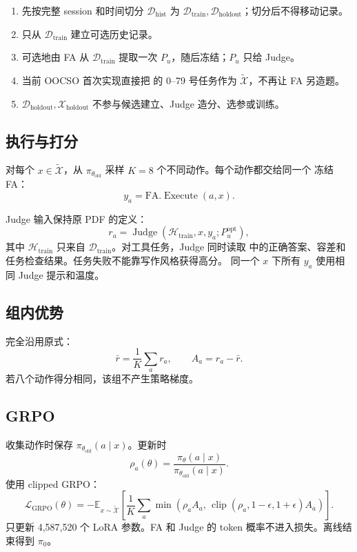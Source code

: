 \documentclass[11pt,UTF8,fontset=none]{ctexart}
\newcommand{\Dhist}{\mathcal D_{\mathrm{hist}}}
\newcommand{\Dtrain}{\mathcal D_{\mathrm{train}}}
\newcommand{\Dholdout}{\mathcal D_{\mathrm{holdout}}}
\newcommand{\Xholdout}{\mathcal X_{\mathrm{holdout}}}
\newcommand{\Xsim}{\widetilde{\mathcal X}}
\newcommand{\policy}{\pi_{\theta}}
\newcommand{\oldpolicy}{\pi_{\theta_{\mathrm{old}}}}
\newcommand{\FA}{\mathrm{FA}}
\newcommand{\Judge}{\operatorname{Judge}}
\newcommand{\clip}{\operatorname{clip}}
\begin{document}
\begin{enumerate}
  \item 先按完整 session 和时间切分 \(\Dhist\) 为
    \(\Dtrain,\Dholdout\)；切分后不得移动记录。
  \item 只从 \(\Dtrain\) 建立可选历史记录。
  \item 可选地由 FA 从 \(\Dtrain\) 提取一次 \(P_u\)，随后冻结；\(P_u\) 只给 Judge。
  \item 当前 OOCSO 首次实现直接把
     的 0--79 号任务作为 \(\Xsim\)，不再让 FA 另造题。
  \item \(\Dholdout,\Xholdout\) 不参与候选建立、Judge 造分、选参或训练。
\end{enumerate}

\subsection{执行与打分}

对每个 \(x\in\Xsim\)，从 \(\oldpolicy\) 采样 \(K=8\) 个不同动作。每个动作都交给同一个
冻结 FA：
\begin{equation}
  y_a=\FA.\operatorname{Execute}(a,x).
  \label{eq:execute}
\end{equation}

Judge 输入保持原 PDF 的定义：
\begin{equation}
  r_a
  =
  \Judge(\mathcal H_{\mathrm{train}},x,y_a;P_u^{\mathrm{opt}}),
  \label{eq:reward}
\end{equation}
其中 \(\mathcal H_{\mathrm{train}}\) 只来自 \(\Dtrain\)。对工具任务，Judge 同时读取
 中的正确答案、容差和任务检查结果。任务失败不能靠写作风格获得高分。
同一个 \(x\) 下所有 \(y_a\) 使用相同 Judge 提示和温度。

\subsection{组内优势}

完全沿用原式：
\begin{equation}
  \bar r
  =
  \frac{1}{K}\sum_a r_a,
  \qquad
  A_a=r_a-\bar r.
  \label{eq:advantage}
\end{equation}
若八个动作得分相同，该组不产生策略梯度。

\subsection{GRPO}

收集动作时保存 \(\oldpolicy(a\mid x)\)。更新时
\begin{equation}
  \rho_a(\theta)
  =
  \frac{\policy(a\mid x)}
       {\oldpolicy(a\mid x)}.
\end{equation}
使用 clipped GRPO：
\begin{equation}
  \mathcal L_{\mathrm{GRPO}}(\theta)
  =
  -\mathbb E_{x\sim\Xsim}
  \left[
  \frac{1}{K}
  \sum_a
  \min\left(
    \rho_a A_a,\,
    \clip(\rho_a,1-\epsilon,1+\epsilon)A_a
  \right)
  \right].
  \label{eq:grpo}
\end{equation}
只更新 4,587,520 个 LoRA 参数。FA 和 Judge 的 token 概率不进入损失。离线结束得到
\(\pi_0\)。
\end{document}
